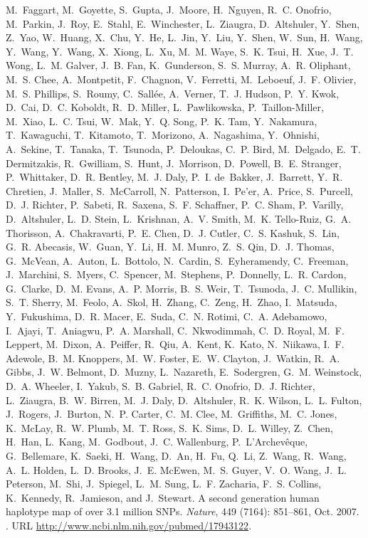 \documentclass{article}
\begin{document}
\begin{thebibliography}{76}
  M.~Faggart, M.~Goyette, S.~Gupta, J.~Moore, H.~Nguyen, R.~C. Onofrio,
  M.~Parkin, J.~Roy, E.~Stahl, E.~Winchester, L.~Ziaugra, D.~Altshuler,
  Y.~Shen, Z.~Yao, W.~Huang, X.~Chu, Y.~He, L.~Jin, Y.~Liu, Y.~Shen, W.~Sun,
  H.~Wang, Y.~Wang, Y.~Wang, X.~Xiong, L.~Xu, M.~M. Waye, S.~K. Tsui, H.~Xue,
  J.~T. Wong, L.~M. Galver, J.~B. Fan, K.~Gunderson, S.~S. Murray, A.~R.
  Oliphant, M.~S. Chee, A.~Montpetit, F.~Chagnon, V.~Ferretti, M.~Leboeuf,
  J.~F. Olivier, M.~S. Phillips, S.~Roumy, C.~Sall{\'e}e, A.~Verner, T.~J.
  Hudson, P.~Y. Kwok, D.~Cai, D.~C. Koboldt, R.~D. Miller, L.~Pawlikowska,
  P.~Taillon-Miller, M.~Xiao, L.~C. Tsui, W.~Mak, Y.~Q. Song, P.~K. Tam,
  Y.~Nakamura, T.~Kawaguchi, T.~Kitamoto, T.~Morizono, A.~Nagashima,
  Y.~Ohnishi, A.~Sekine, T.~Tanaka, T.~Tsunoda, P.~Deloukas, C.~P. Bird,
  M.~Delgado, E.~T. Dermitzakis, R.~Gwilliam, S.~Hunt, J.~Morrison, D.~Powell,
  B.~E. Stranger, P.~Whittaker, D.~R. Bentley, M.~J. Daly, P.~I. de~Bakker,
  J.~Barrett, Y.~R. Chretien, J.~Maller, S.~McCarroll, N.~Patterson, I.~Pe'er,
  A.~Price, S.~Purcell, D.~J. Richter, P.~Sabeti, R.~Saxena, S.~F. Schaffner,
  P.~C. Sham, P.~Varilly, D.~Altshuler, L.~D. Stein, L.~Krishnan, A.~V. Smith,
  M.~K. Tello-Ruiz, G.~A. Thorisson, A.~Chakravarti, P.~E. Chen, D.~J. Cutler,
  C.~S. Kashuk, S.~Lin, G.~R. Abecasis, W.~Guan, Y.~Li, H.~M. Munro, Z.~S. Qin,
  D.~J. Thomas, G.~McVean, A.~Auton, L.~Bottolo, N.~Cardin, S.~Eyheramendy,
  C.~Freeman, J.~Marchini, S.~Myers, C.~Spencer, M.~Stephens, P.~Donnelly,
  L.~R. Cardon, G.~Clarke, D.~M. Evans, A.~P. Morris, B.~S. Weir, T.~Tsunoda,
  J.~C. Mullikin, S.~T. Sherry, M.~Feolo, A.~Skol, H.~Zhang, C.~Zeng, H.~Zhao,
  I.~Matsuda, Y.~Fukushima, D.~R. Macer, E.~Suda, C.~N. Rotimi, C.~A.
  Adebamowo, I.~Ajayi, T.~Aniagwu, P.~A. Marshall, C.~Nkwodimmah, C.~D. Royal,
  M.~F. Leppert, M.~Dixon, A.~Peiffer, R.~Qiu, A.~Kent, K.~Kato, N.~Niikawa,
  I.~F. Adewole, B.~M. Knoppers, M.~W. Foster, E.~W. Clayton, J.~Watkin, R.~A.
  Gibbs, J.~W. Belmont, D.~Muzny, L.~Nazareth, E.~Sodergren, G.~M. Weinstock,
  D.~A. Wheeler, I.~Yakub, S.~B. Gabriel, R.~C. Onofrio, D.~J. Richter,
  L.~Ziaugra, B.~W. Birren, M.~J. Daly, D.~Altshuler, R.~K. Wilson, L.~L.
  Fulton, J.~Rogers, J.~Burton, N.~P. Carter, C.~M. Clee, M.~Griffiths, M.~C.
  Jones, K.~McLay, R.~W. Plumb, M.~T. Ross, S.~K. Sims, D.~L. Willey, Z.~Chen,
  H.~Han, L.~Kang, M.~Godbout, J.~C. Wallenburg, P.~L'Archev{\^e}que,
  G.~Bellemare, K.~Saeki, H.~Wang, D.~An, H.~Fu, Q.~Li, Z.~Wang, R.~Wang, A.~L.
  Holden, L.~D. Brooks, J.~E. McEwen, M.~S. Guyer, V.~O. Wang, J.~L. Peterson,
  M.~Shi, J.~Spiegel, L.~M. Sung, L.~F. Zacharia, F.~S. Collins, K.~Kennedy,
  R.~Jamieson, and J.~Stewart.
\newblock A second generation human haplotype map of over 3.1 million {SNPs}.
\newblock \emph{Nature}, 449 (7164): 851--861, Oct. 2007.
\newblock {}.
\newblock URL \url{http://www.ncbi.nlm.nih.gov/pubmed/17943122}.


\end{thebibliography}
\end{document}
